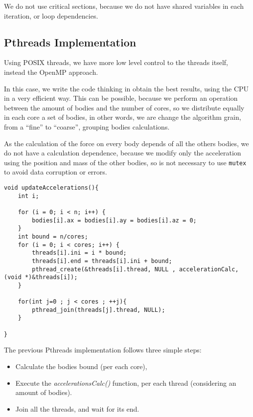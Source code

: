 We do not use critical sections,
because we do not have shared variables
in each iteration, or loop dependencies.

\subsection{Pthreads Implementation}

Using POSIX threads, we have more low level control
to the threads itself, instead the OpenMP approach.

In this case, we write the code thinking in obtain
the best results, using the CPU in a very efficient way.
This can be possible, because we perform an operation
between the amount of bodies and the number of cores,
so we distribute equally in each core a set of bodies,
in other words, we are change the algorithm grain,
from a ``fine'' to ``coarse'', grouping bodies
calculations.

As the calculation of the force on every body
depends of all the others bodies, we do not have
a calculation dependence, because we modify only the acceleration
using the position and mass of the other bodies,
so is not necessary to use \texttt{mutex} to avoid
data corruption or errors.

\begin{lstlisting}[style=C]
void updateAccelerations(){
    int i;

    for (i = 0; i < n; i++) {
        bodies[i].ax = bodies[i].ay = bodies[i].az = 0;
    }
    int bound = n/cores;
    for (i = 0; i < cores; i++) {
        threads[i].ini = i * bound;
        threads[i].end = threads[i].ini + bound;
        pthread_create(&threads[i].thread, NULL , accelerationCalc, (void *)&threads[i]);
    }

    for(int j=0 ; j < cores ; ++j){
        pthread_join(threads[j].thread, NULL);
    }

}
\end{lstlisting}

The previous Pthreads implementation follows three simple steps:

\begin{itemize}
    \item Calculate the bodies bound (per each core),
    \item Execute the \emph{accelerationsCalc()} function, per each thread (considering an amount of bodies).
    \item Join all the threads, and wait for its end.
\end{itemize}

